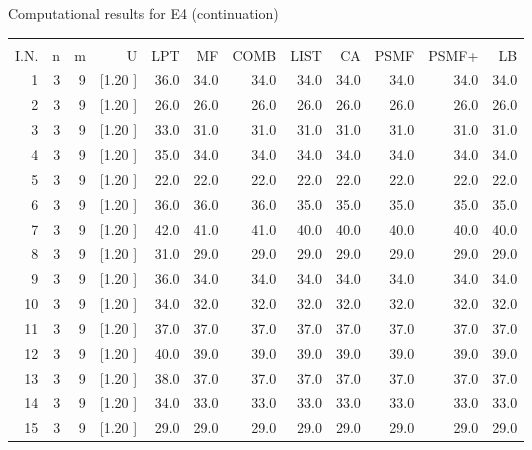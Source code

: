 \documentclass[12pt,a4paper]{article}
\begin{document}
\newpage
\begin{center}
 Computational results for E4 (continuation) {\tiny
\begin{tabular}{r r r r r r r r r r r r}\hline
    &   &   &          &        &        &        &        &        &        &        &       \\[-0.1in]
  I.N.  &  n  &  m  &  U  &  LPT  &  MF  &  COMB  &  LIST  &  CA  & PSMF &PSMF+ & LB \\[0.03in]
\hline
   1&  3&  9&[1.20      ]&    36.0&    34.0&    34.0&    34.0&    34.0&    34.0&    34.0&    34.0\\[-0.02in]
   2&  3&  9&[1.20      ]&    26.0&    26.0&    26.0&    26.0&    26.0&    26.0&    26.0&    26.0\\[-0.02in]
   3&  3&  9&[1.20      ]&    33.0&    31.0&    31.0&    31.0&    31.0&    31.0&    31.0&    31.0\\[-0.02in]
   4&  3&  9&[1.20      ]&    35.0&    34.0&    34.0&    34.0&    34.0&    34.0&    34.0&    34.0\\[-0.02in]
   5&  3&  9&[1.20      ]&    22.0&    22.0&    22.0&    22.0&    22.0&    22.0&    22.0&    22.0\\[-0.02in]
   6&  3&  9&[1.20      ]&    36.0&    36.0&    36.0&    35.0&    35.0&    35.0&    35.0&    35.0\\[-0.02in]
   7&  3&  9&[1.20      ]&    42.0&    41.0&    41.0&    40.0&    40.0&    40.0&    40.0&    40.0\\[-0.02in]
   8&  3&  9&[1.20      ]&    31.0&    29.0&    29.0&    29.0&    29.0&    29.0&    29.0&    29.0\\[-0.02in]
   9&  3&  9&[1.20      ]&    36.0&    34.0&    34.0&    34.0&    34.0&    34.0&    34.0&    34.0\\[-0.02in]
  10&  3&  9&[1.20      ]&    34.0&    32.0&    32.0&    32.0&    32.0&    32.0&    32.0&    32.0\\[-0.02in]
  11&  3&  9&[1.20      ]&    37.0&    37.0&    37.0&    37.0&    37.0&    37.0&    37.0&    37.0\\[-0.02in]
  12&  3&  9&[1.20      ]&    40.0&    39.0&    39.0&    39.0&    39.0&    39.0&    39.0&    39.0\\[-0.02in]
  13&  3&  9&[1.20      ]&    38.0&    37.0&    37.0&    37.0&    37.0&    37.0&    37.0&    37.0\\[-0.02in]
  14&  3&  9&[1.20      ]&    34.0&    33.0&    33.0&    33.0&    33.0&    33.0&    33.0&    33.0\\[-0.02in]
  15&  3&  9&[1.20      ]&    29.0&    29.0&    29.0&    29.0&    29.0&    29.0&    29.0&    29.0\\[-0.02in]

\end{tabular}}
\end{center}
\end{document}
